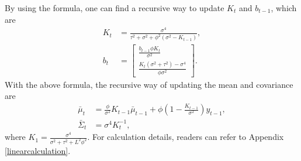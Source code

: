 By using the formula, one can find a recursive way to update $K_{t}$ and $b_{t-1}$, which are 
\begin{align}
K_{t}  &=\frac{\sigma^4}{\tau^2+\sigma^2+\phi^2\left(\sigma^2-K_{t-1}\right)},\\
b_{t} &= \begin{bmatrix}
\frac{b_{t-1}\phi K_{t}}{\sigma^2} \\ \frac{K_{t}\left(\sigma^2+\tau^2\right)-\sigma^4 }{\phi\sigma^2}
\end{bmatrix}. 
\end{align}
With the above formula, the recursive way of updating the mean and covariance are 
\begin{align}
\bar{\mu}_{t}       & = \frac{\phi}{\sigma^2}K_{t-1}\bar{\mu}_{t-1} + \phi \left(1 - \frac{K_{t-1}}{\sigma^2}\right)y_{t-1}, \\
\bar{\Sigma}_{t}  &= \sigma^4K_{t}^{-1},
\end{align}
where $K_1=\frac{\sigma^4}{\sigma^2+\tau^2+L^2\phi^2}$. For calculation details, readers can refer to Appendix \ref{linearcalculation}. 



